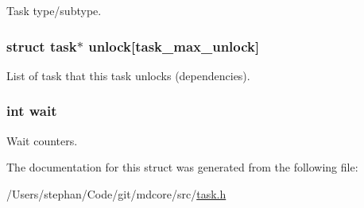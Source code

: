 Task type/subtype. \hypertarget{structtask_a9ea2a7c7ec9d2b1b1bc4ef7a89c6727b}{
\subsubsection[{unlock}]{\setlength{\rightskip}{0pt plus 5cm}struct {\bf task}$\ast$ unlock\mbox{[}{\bf task\-\_\-max\-\_\-unlock}\mbox{]}}}\label{structtask_a9ea2a7c7ec9d2b1b1bc4ef7a89c6727b}
List of task that this task unlocks (dependencies). \hypertarget{structtask_aaefdb10b18059f3c08332338630b3f68}{
\subsubsection[{wait}]{\setlength{\rightskip}{0pt plus 5cm}int wait}}\label{structtask_aaefdb10b18059f3c08332338630b3f68}
Wait counters. 

The documentation for this struct was generated from the following file\-:\begin{DoxyCompactItemize}
\item 
/\-Users/stephan/\-Code/git/mdcore/src/\hyperlink{task_8h}{task.\-h}\end{DoxyCompactItemize}
